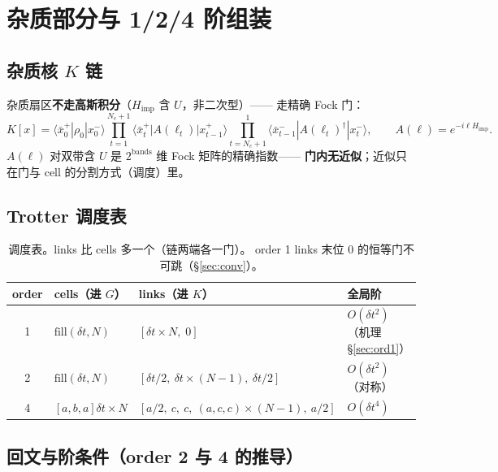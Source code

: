 \documentclass[11pt,a4paper]{ctexart}
\theoremstyle{plain}
\theoremstyle{definition}
\theoremstyle{remark}
\begin{document}
\section{杂质部分与 1/2/4 阶组装}\label{sec:assembly}

\subsection{杂质核 \texorpdfstring{$K$}{K} 链}

杂质扇区\textbf{不走高斯积分}（$H_{\mathrm{imp}}$ 含 $U$，非二次型）——
走精确 Fock 门：
\begin{equation}
K[x] = \langle \bar x_0^{+}|\rho_0|x_0^{-}\rangle
\prod_{t=1}^{N_c+1}\langle \bar x_t^{+}|A(\ell_t)|x_{t-1}^{+}\rangle
\prod_{t=N_c+1}^{1}\langle \bar x_{t-1}^{-}|A(\ell_t)^{\dagger}|x_t^{-}\rangle,
\qquad A(\ell) = e^{-i\ell H_{\mathrm{imp}}}.
\label{eq:Kchain}
\end{equation}
$A(\ell)$ 对双带含 $U$ 是 $2^{\mathrm{bands}}$ 维 Fock 矩阵的精确指数——
\textbf{门内无近似}；近似只在门与 cell 的分割方式（调度）里。

\subsection{Trotter 调度表}

\begin{table}[htbp]
\centering
\begin{tabular}{clll}
\toprule
order & cells（进 $G$） & links（进 $K$） & 全局阶 \\
\midrule
1 & $\mathrm{fill}(\delta t, N)$ & $[\delta t \times N,\; 0]$ & $O(\delta t^2)$（机理 \S\ref{sec:ord1}） \\
2 & $\mathrm{fill}(\delta t, N)$ & $[\delta t/2,\ \delta t\times(N{-}1),\ \delta t/2]$ & $O(\delta t^2)$（对称） \\
4 & $[a,b,a]\delta t \times N$ & $[a/2,\ c,\ c,\ (a,c,c)\times(N{-}1),\ a/2]$ & $O(\delta t^4)$ \\
\bottomrule
\end{tabular}
\caption{调度表。links 比 cells 多一个（链两端各一门）。
order 1 links 末位 0 的恒等门不可跳（\S\ref{sec:conv}）。}
\end{table}

\subsection{回文与阶条件（order 2 与 4 的推导）}
\end{document}
